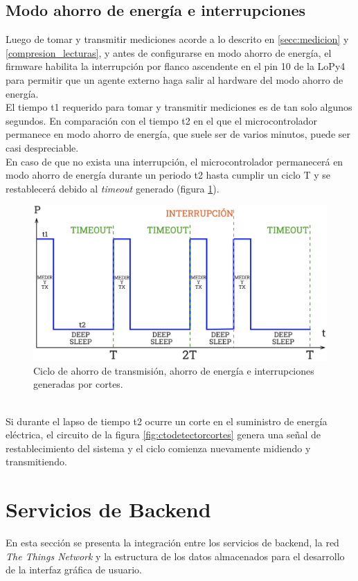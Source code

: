 \subsection{Modo ahorro de energía e interrupciones}
Luego de tomar y transmitir mediciones acorde a lo descrito en \ref{secc:medicion} y \ref{compresion_lecturas}, y antes de configurarse en modo ahorro de energía, el firmware habilita la interrupción por flanco ascendente en el pin 10 de la LoPy4 para permitir que un agente externo haga salir al hardware del modo ahorro de energ\'{i}a.\\
El tiempo t1 requerido para tomar y transmitir mediciones es de tan solo algunos segundos. En comparación con el tiempo t2 en el que el microcontrolador permanece en modo ahorro de energía, que suele ser de varios minutos, puede ser casi despreciable.\\ 
En caso de que no exista una interrupción, el microcontrolador permanecerá en modo ahorro de energía durante un periodo t2 hasta cumplir un ciclo T y se restablecerá debido al \textit{timeout} generado (figura \ref{fig:ciclodeepsleep}).\\
\begin{figure}
	\centering
	\includegraphics[width=1.0\linewidth]{Figures/ciclodeepsleep}
	\caption{Ciclo de ahorro de transmisión, ahorro de energía e interrupciones generadas por cortes.}
	\label{fig:ciclodeepsleep}
\end{figure}\\
Si durante el lapso de tiempo t2 ocurre un corte en el suministro de energ\'{i}a el\'{e}ctrica, el circuito de la figura \ref{fig:ctodetectorcortes} genera una señal de restablecimiento del sistema y el ciclo comienza nuevamente midiendo y transmitiendo.\\


\section{Servicios de Backend}
\label{seccion_bes}
En esta sección se presenta la integración entre los servicios de backend, la red \textit{The Things Network} y la estructura de los datos almacenados para el desarrollo de la interfaz gráfica de usuario.\\
